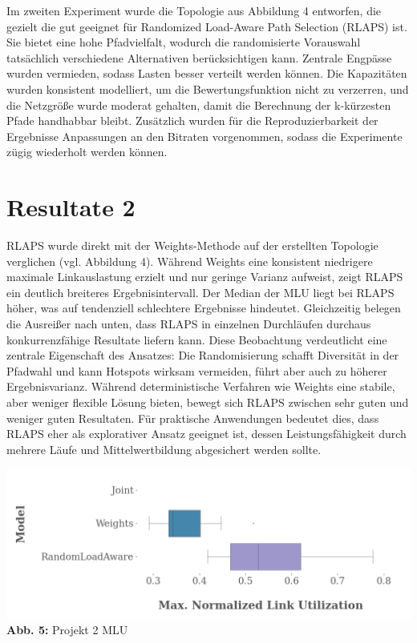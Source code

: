 Im zweiten Experiment wurde die Topologie aus Abbildung 4 entworfen, die gezielt die gut geeignet für Randomized Load-Aware Path Selection (RLAPS) ist. Sie bietet eine hohe Pfadvielfalt, wodurch die randomisierte Vorauswahl tatsächlich verschiedene Alternativen berücksichtigen kann. Zentrale Engpässe wurden vermieden, sodass Lasten besser verteilt werden können. Die Kapazitäten wurden konsistent modelliert, um die Bewertungsfunktion nicht zu verzerren, und die Netzgröße wurde moderat gehalten, damit die Berechnung der k-kürzesten Pfade handhabbar bleibt. Zusätzlich wurden für die Reproduzierbarkeit der Ergebnisse Anpassungen an den Bitraten vorgenommen, sodass die Experimente zügig wiederholt werden können.

\section{Resultate 2}
RLAPS wurde direkt mit der Weights-Methode auf der erstellten Topologie verglichen (vgl. Abbildung 4). Während Weights eine konsistent niedrigere maximale Linkauslastung erzielt und nur geringe Varianz aufweist, zeigt RLAPS ein deutlich breiteres Ergebnisintervall. Der Median der MLU liegt bei RLAPS höher, was auf tendenziell schlechtere Ergebnisse hindeutet. Gleichzeitig belegen die Ausreißer nach unten, dass RLAPS in einzelnen Durchläufen durchaus konkurrenzfähige Resultate liefern kann.
Diese Beobachtung verdeutlicht eine zentrale Eigenschaft des Ansatzes: Die Randomisierung schafft Diversität in der Pfadwahl und kann Hotspots wirksam vermeiden, führt aber auch zu höherer Ergebnisvarianz. Während deterministische Verfahren wie Weights eine stabile, aber weniger flexible Lösung bieten, bewegt sich RLAPS zwischen sehr guten und weniger guten Resultaten. Für praktische Anwendungen bedeutet dies, dass RLAPS eher als explorativer Ansatz geeignet ist, dessen Leistungsfähigkeit durch mehrere Läufe und Mittelwertbildung abgesichert werden sollte.

\begin{center}
        \centering
        \includegraphics[width=\textwidth]{Report/bilder/RLAPS/results_compare_rla.png}
        \small\textbf{Abb. 5:} Projekt 2 MLU
        \label{fig:enter-label}
\end{center}